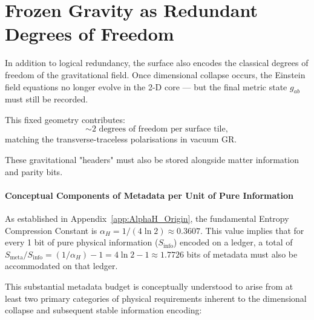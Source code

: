 \documentclass[a4paper, 12pt, oneside]{book}
\numberwithin{equation}{chapter}
\begin{document}
\section{Frozen Gravity as Redundant Degrees of Freedom}
\label{sec:FrozenGravity}

In addition to logical redundancy, the surface also encodes the classical degrees of freedom of the gravitational field.  
Once dimensional collapse occurs, the Einstein field equations no longer evolve in the 2-D core —  
but the final metric state \( g_{ab} \) must still be recorded.

This fixed geometry contributes:
\[
    \sim 2 \text{ degrees of freedom per surface tile},
\]
matching the transverse-traceless polarisations in vacuum GR.

These gravitational "headers" must also be stored alongside matter information and parity bits.

\paragraph{Conceptual Components of Metadata per Unit of Pure Information}
As established in Appendix~\ref{app:AlphaH_Origin}, the fundamental Entropy Compression Constant is $\alpha_H = 1/(4\ln 2) \approx 0.3607$. This value implies that for every 1 bit of pure physical information ($S_{\text{info}}$) encoded on a ledger, a total of $S_{\text{meta}}/S_{\text{info}} = (1/\alpha_H) - 1 = 4\ln 2 - 1 \approx 1.7726$ bits of metadata must also be accommodated on that ledger.

This substantial metadata budget is conceptually understood to arise from at least two primary categories of physical requirements inherent to the dimensional collapse and subsequent stable information encoding:
\end{document}
